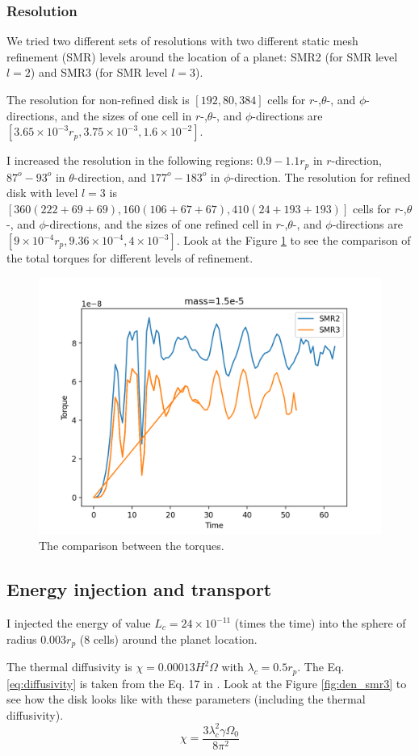 \documentclass[twocolumn]{aastex631}
\begin{document}
\subsubsection{Resolution}
We tried two different sets of resolutions with two different static mesh refinement (SMR) levels around the location of a planet: SMR2 (for SMR level $l=2$) and SMR3 (for SMR level $l=3$).

The resolution for non-refined disk is $[192,80,384]$ cells for $r$-,$\theta$-, and $\phi$-directions, and the sizes of one cell in $r$-,$\theta$-, and $\phi$-directions are $[3.65\times 10^{-3}r_p, 3.75\times 10^{-3}, 1.6\times 10^{-2}]$. 

I increased the resolution in the following regions: $0.9-1.1 r_p$ in $r$-direction, $87^o-93^o$ in $\theta$-direction, and $177^o-183^o$ in $\phi$-direction. The resolution for refined disk with level $l=3$ is $[360 (222+69+69),160 (106+67+67),410 (24+193+193)]$ cells for $r$-,$\theta$-, and $\phi$-directions, and the sizes of one refined cell in $r$-,$\theta$-, and $\phi$-directions are $[9\times 10^{-4}r_p, 9.36\times 10^{-4}, 4\times 10^{-3}]$.
Look at the Figure \ref{fig:twotorques} to see the comparison of the total torques for different levels of refinement.
\begin{figure}
\centering
	\includegraphics[width=0.6\columnwidth]{comparison_torques.png}
    \caption{The comparison between the torques.}
    \label{fig:twotorques}
\end{figure}



\subsection{Energy injection and transport}
I injected the energy of value $L_c=24\times 10^{-11}$ (times the time) into the sphere of radius $0.003 r_p$ (8 cells) around the planet location.

The thermal diffusivity is $\chi=0.00013 H^2\Omega$ with $\lambda_c=0.5r_p$. The Eq. \ref{eq:diffusivity} is taken from the Eq. 17 in \citet{hankla20}. 
Look at the Figure \ref{fig:den_smr3} to see how the disk looks like with these parameters (including the thermal diffusivity). 
\begin{equation}\label{eq:diffusivity}
    \chi=\frac{3\lambda_c^2\gamma\Omega_0}{8\pi^2}
\end{equation}
\end{document}
